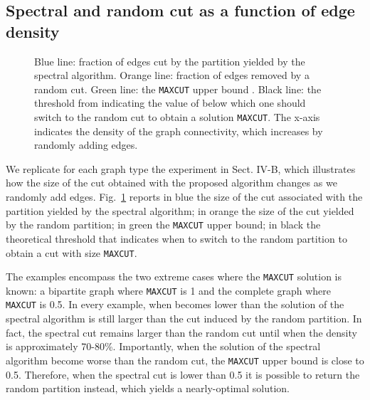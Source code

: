 \documentclass[journal]{IEEEtran}
\newcommand{\maxcut}{\texttt{\small{MAXCUT}}}
\begin{document}
    
\subsection{Spectral and random cut as a function of edge density}

\begin{figure}[!ht]
    \centering
    

    \caption{Blue line: fraction of edges cut by the partition yielded by the spectral algorithm. 
    Orange line: fraction of edges removed by a random cut. 
    Green line: the \maxcut{} upper bound . 
    Black line: the threshold from \cite{trevisan2012max} indicating the value of  below which one should switch to the random cut to obtain a solution  \maxcut{}. 
    The x-axis indicates the density of the graph connectivity, which increases by randomly adding edges.}
    \label{fig:adding_edges2}
\end{figure}

We replicate for each graph type the experiment in Sect. IV-B, which illustrates how the size of the cut obtained with the proposed algorithm changes as we randomly add edges.
Fig.~\ref{fig:adding_edges2} reports in blue the size of the cut associated with the partition yielded by the spectral algorithm; in orange the size of the cut yielded by the random partition; in green the \maxcut{} upper bound; in black the theoretical threshold that indicates when to switch to the random partition to obtain a cut with size  \maxcut{}.

The examples encompass the two extreme cases where the \maxcut{} solution is known: a bipartite graph where \maxcut{} is 1 and the complete graph where \maxcut{} is 0.5.
In every example, when  becomes lower than  the solution of the spectral algorithm is still larger than the cut induced by the random partition.
In fact, the spectral cut remains larger than the random cut until when the density is approximately 70-80\%.
Importantly, when the solution of the spectral algorithm become worse than the random cut, the \maxcut{} upper bound is close to 0.5.
Therefore, when the spectral cut is lower than 0.5 it is possible to return the random partition instead, which yields a nearly-optimal solution.
\end{document}
